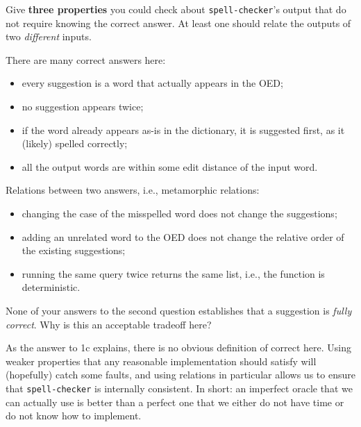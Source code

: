\documentclass[addpoints, answers]{exam}
\newcommand{\Code}[1]{\texttt{#1}}
\newcommand{\nonAnswerNewPage}{\ifprintanswers \vfill \else \newpage \fi}
\begin{document}
\begin{questions}
\question[6] Give \textbf{three properties} you could check about
  \Code{spell-checker}'s output that do not require knowing the
  correct answer. At least one should relate the outputs of two
  \emph{different} inputs. %
  \begin{solutionorbox}[3.2in]
    There are many correct answers here:
    \begin{itemize}
    \item every suggestion is a word that actually appears in the OED;
    \item no suggestion appears twice;
    \item if the word already appears as-is in the dictionary, it is
      suggested first, as it (likely) spelled correctly;
    \item all the output words are within some edit distance of the
      input word.
    \end{itemize}
    Relations between two answers, i.e., metamorphic relations:
    \begin{itemize}
    \item changing the case of the misspelled word does not change the
      suggestions;
    \item adding an unrelated word to the OED does not change the
      relative order of the existing suggestions;
    \item running the same query twice returns the same list, i.e.,
      the function is deterministic.
    \end{itemize}
  \end{solutionorbox}

  \nonAnswerNewPage
\question[1] None of your answers to the second question establishes
  that a suggestion is \emph{fully correct}. Why is this an acceptable
  tradeoff here? %
  \begin{solutionorbox}[2in]
    As the answer to 1c explains, there is no obvious definition of
    correct here. Using weaker properties that any reasonable
    implementation should satisfy will (hopefully) catch some faults,
    and using relations in particular allows us to ensure that
    \Code{spell-checker} is internally consistent. In short: an
    imperfect oracle that we can actually use is better than a perfect
    one that we either do not have time or do not know how to
    implement.
  \end{solutionorbox}



\end{questions}
\end{document}
